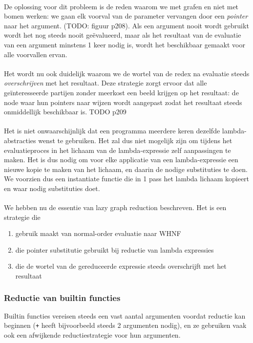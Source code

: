 \documentclass[a4paper,10pt]{article}
\begin{document}
\paragraph{}
De oplossing voor dit probleem is de reden waarom we met grafen en niet met bomen werken: we gaan elk voorval van de parameter vervangen door een \emph{pointer} naar het argument.
(TODO: figuur p208).
Als een argument nooit wordt gebruikt wordt het nog steeds nooit ge{\"e}valueerd, maar als het resultaat van de evaluatie van een argument minstens 1 keer nodig is, wordt het beschikbaar gemaakt voor alle voorvallen ervan.
\paragraph{}
Het wordt nu ook duidelijk waarom we de wortel van de redex na evaluatie steeds \emph{overschrijven} met het resultaat.
Deze strategie zorgt ervoor dat alle ge{\"i}nteresseerde partijen zonder meerkost een beeld krijgen op het resultaat: de node waar hun pointers naar wijzen wordt aangepast zodat het resultaat steeds onmiddellijk beschikbaar is.
TODO p209
\paragraph{}
Het is niet onwaarschijnlijk dat een programma meerdere keren dezelfde lambda-abstracties wenst te gebruiken.
Het zal dus niet mogelijk zijn om tijdens het evaluatieproces in het lichaam van de lambda-expressie zelf aanpassingen te maken.
Het is dus nodig om voor elke applicatie van een lambda-expressie een nieuwe kopie te maken van het lichaam, en daarin de nodige substituties te doen.
We voorzien dus een instantiate functie die in 1 pass het lambda lichaam kopieert en waar nodig substituties doet.
\paragraph{}
We hebben nu de essentie van lazy graph reduction beschreven. Het is een strategie die
\begin{enumerate}
\item gebruik maakt van normal-order evaluatie naar WHNF
\item die pointer substitutie gebruikt bij reductie van lambda expressies
\item die de wortel van de gereduceerde expressie steeds overschrijft met het resultaat
\end{enumerate}

\subsubsection{Reductie van builtin functies}
Builtin functies vereisen steeds een vast aantal argumenten voordat reductie kan beginnen (\texttt{+} heeft bijvoorbeeld steeds 2 argumenten nodig), en ze gebruiken vaak ook een afwijkende reductiestrategie voor hun argumenten.
\end{document}
